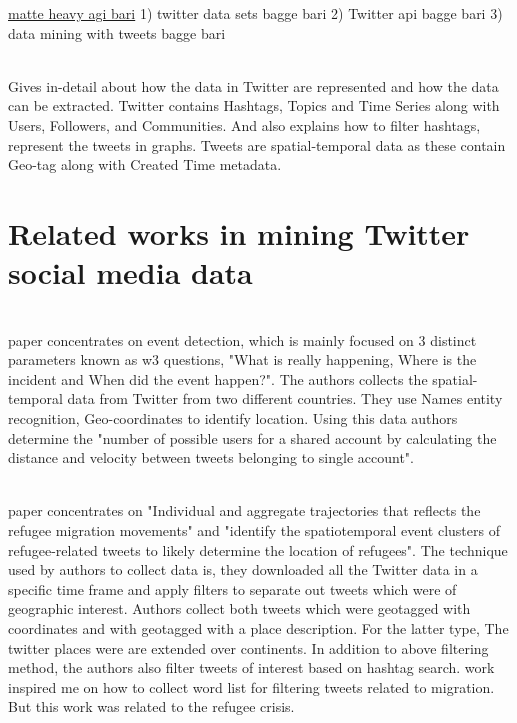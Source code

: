 \underline{matte heavy agi bari}
1) twitter data sets bagge bari
2) Twitter api bagge bari
3) data mining with tweets bagge bari



\\ \cite{Marco} Gives in-detail about how the data in Twitter are represented
and how the data can be extracted. Twitter contains Hashtags, Topics and Time Series along with
Users, Followers, and Communities. And  \cite{Marco} also explains how to filter hashtags, represent the
tweets in graphs. Tweets are spatial-temporal data as these contain Geo-tag along with Created
Time metadata.

\section{Related works in mining Twitter social media data}



\\
\cite{Goergen:2014:STA:2670386.2670392} paper concentrates on event detection, which is mainly focused on 3 distinct parameters
known as w3 questions, "What is really happening, Where is the incident and When did the
event happen?". The authors collects the spatial-temporal data from Twitter from two different
countries. They use Names entity recognition, Geo-coordinates to identify location. Using this
data authors determine the "number of possible users for a shared account by calculating the
distance and velocity between tweets belonging to single account".

\\ \cite{Hübl} paper concentrates on "Individual and aggregate trajectories that reflects the refugee migration
movements" and "identify the spatiotemporal event clusters of refugee-related tweets to
likely determine the location of refugees". The technique used by authors to collect data is, they
downloaded all the Twitter data in a specific time frame and apply filters to separate out tweets
which were of geographic interest. Authors collect both tweets which were geotagged with coordinates
and with geotagged with a place description. For the latter type, The twitter places were
are extended over continents. In addition to above filtering method, the authors also filter tweets
of interest based on hashtag search. \cite{Hübl} work inspired me on how to collect word list for filtering
tweets related to migration. But this work was related to the refugee crisis.
 


